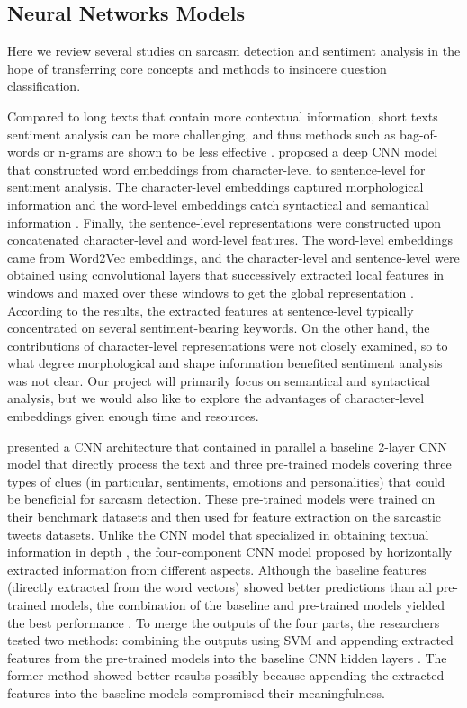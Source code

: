 \documentclass[12pt]{diazessay} %
\begin{document}
\subsection{Neural Networks Models} \label{nn-models}


Here we review several studies on sarcasm detection and sentiment analysis in the hope of transferring core concepts and methods to insincere question classification.

Compared to long texts that contain more contextual information, short texts sentiment analysis can be more challenging, and thus methods such as bag-of-words or n-grams are shown to be less effective \citep{barbosa2010, santos2014}. \citep{santos2014} proposed a deep CNN model that constructed word embeddings from character-level to sentence-level for sentiment analysis. The character-level embeddings captured morphological information and the word-level embeddings catch syntactical and semantical information \citep{santos2014}. Finally, the sentence-level representations were constructed upon concatenated character-level and word-level features. The word-level embeddings came from Word2Vec embeddings, and the character-level and sentence-level were obtained using convolutional layers that successively extracted local features in windows and maxed over these windows to get the global representation \citep{santos2014}. According to the results, the extracted features at sentence-level typically concentrated on several sentiment-bearing keywords. On the other hand, the contributions of character-level representations were not closely examined, so to what degree morphological and shape information benefited sentiment analysis was not clear. Our project will primarily focus on semantical and syntactical analysis, but we would also like to explore the advantages of character-level embeddings given enough time and resources. 

\citet{poria2017} presented a CNN architecture that contained in parallel a baseline 2-layer CNN model that directly process the text and three pre-trained models covering three types of clues (in particular, sentiments, emotions and personalities) that could be beneficial for sarcasm detection. These pre-trained models were trained on their benchmark datasets and then used for feature extraction on the sarcastic tweets datasets. Unlike the CNN model that specialized in obtaining textual information in depth \citep{santos2014}, the four-component CNN model proposed by \citet{poria2017} horizontally extracted information from different aspects. Although the baseline features (directly extracted from the word vectors) showed better predictions than all pre-trained models, the combination of the baseline and pre-trained models yielded the best performance \citep{poria2017}. To merge the outputs of the four parts, the researchers tested two methods: combining the outputs using SVM and appending extracted features from the pre-trained models into the baseline CNN hidden layers \citep{poria2017}.  The former method showed better results possibly because appending the extracted features into the baseline models compromised their meaningfulness.\\
\end{document}
